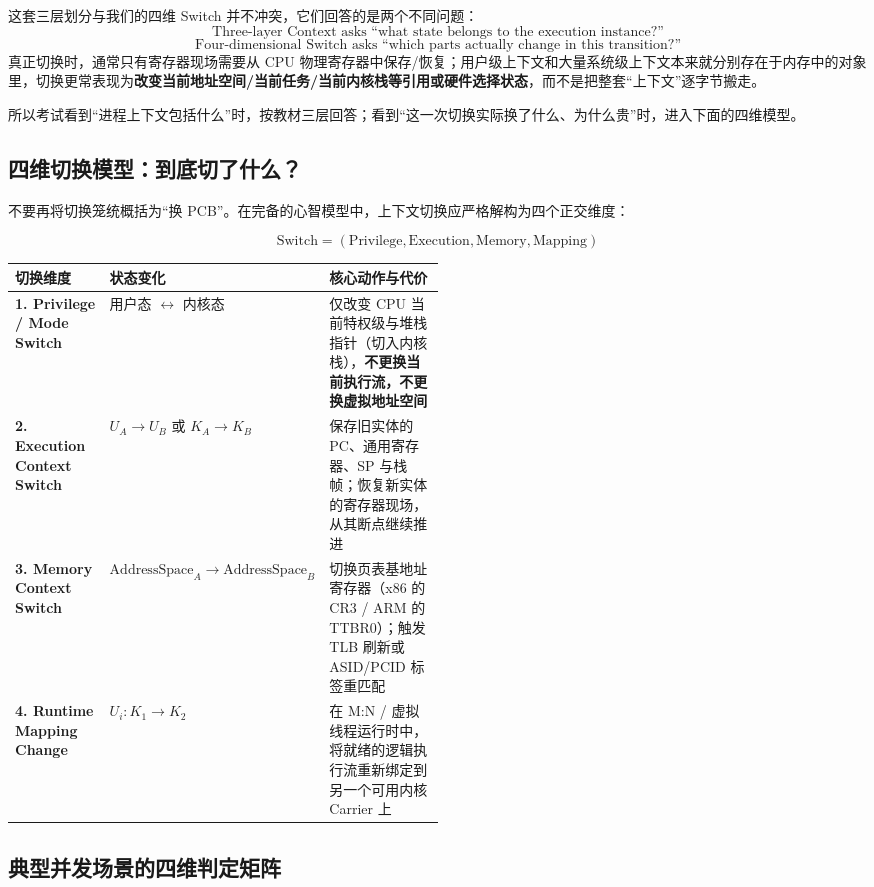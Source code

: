 \documentclass[11pt,a4paper]{ctexart}
\newcommand{\kw}[1]{\textbf{#1}}
\begin{document}
这套三层划分与我们的四维 Switch 并不冲突，它们回答的是两个不同问题：
\[
\boxed{\text{Three-layer Context asks “what state belongs to the execution instance?”}}
\]
\[
\boxed{\text{Four-dimensional Switch asks “which parts actually change in this transition?”}}
\]
真正切换时，通常只有寄存器现场需要从 CPU 物理寄存器中保存/恢复；用户级上下文和大量系统级上下文本来就分别存在于内存中的对象里，切换更常表现为\kw{改变当前地址空间/当前任务/当前内核栈等引用或硬件选择状态}，而不是把整套“上下文”逐字节搬走。

所以考试看到“进程上下文包括什么”时，按教材三层回答；看到“这一次切换实际换了什么、为什么贵”时，进入下面的四维模型。

\subsection{四维切换模型：到底切了什么？}

不要再将切换笼统概括为“换 PCB”。在完备的心智模型中，上下文切换应严格解构为四个正交维度：

\[
\boxed{
\text{Switch} = (\text{Privilege}, \text{Execution}, \text{Memory}, \text{Mapping})
}
\]

\begingroup
\small
\renewcommand{\arraystretch}{1.25}
\setlength{\tabcolsep}{5pt}
\begin{tabularx}{\linewidth}{>{\bfseries}p{0.22\linewidth} p{0.28\linewidth} X}
\toprule
切换维度 & 状态变化 & 核心动作与代价\\
\midrule
1. Privilege / Mode Switch & 用户态 $\longleftrightarrow$ 内核态 & 仅改变 CPU 当前特权级与堆栈指针（切入内核栈），\kw{不更换当前执行流，不更换虚拟地址空间}\\
2. Execution Context Switch & $U_A \to U_B$ 或 $K_A \to K_B$ & 保存旧实体的 PC、通用寄存器、SP 与栈帧；恢复新实体的寄存器现场，从其断点继续推进\\
3. Memory Context Switch & $\text{AddressSpace}_A \to \text{AddressSpace}_B$ & 切换页表基地址寄存器（x86 的 CR3 / ARM 的 TTBR0）；触发 TLB 刷新或 ASID/PCID 标签重匹配\\
4. Runtime Mapping Change & $U_i: K_1 \to K_2$ & 在 M:N / 虚拟线程运行时中，将就绪的逻辑执行流重新绑定到另一个可用内核 Carrier 上\\
\bottomrule
\end{tabularx}
\endgroup

\subsection{典型并发场景的四维判定矩阵}
\end{document}
